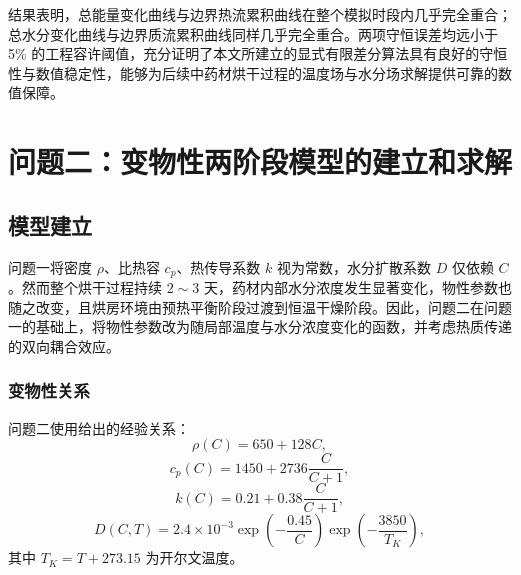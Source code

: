 \documentclass[withoutpreface,bwprint]{cumcm_thesis}
\begin{document}
结果表明，总能量变化曲线与边界热流累积曲线在整个模拟时段内几乎完全重合；总水分变化曲线与边界质流累积曲线同样几乎完全重合。两项守恒误差均远小于 5\% 的工程容许阈值，充分证明了本文所建立的显式有限差分算法具有良好的守恒性与数值稳定性，能够为后续中药材烘干过程的温度场与水分场求解提供可靠的数值保障。





















\newpage
\section{问题二：变物性两阶段模型的建立和求解}
\subsection{模型建立}

问题一将密度 \(\rho\)、比热容 \(c_p\)、热传导系数 \(k\) 视为常数，水分扩散系数 \(D\) 仅依赖 \(C\)。然而整个烘干过程持续 \(2\sim3\) 天，药材内部水分浓度发生显著变化，物性参数也随之改变，且烘房环境由预热平衡阶段过渡到恒温干燥阶段。因此，问题二在问题一的基础上，将物性参数改为随局部温度与水分浓度变化的函数，并考虑热质传递的双向耦合效应。

\subsubsection{变物性关系}

问题二使用给出的经验关系：
\begin{equation}
\rho(C) = 650 + 128C,
\end{equation}
\begin{equation}
c_p(C) = 1450 + 2736\frac{C}{C+1},
\end{equation}
\begin{equation}
k(C) = 0.21 + 0.38\frac{C}{C+1},
\end{equation}
\begin{equation}
D(C,T) = 2.4\times 10^{-3}\exp\left(-\frac{0.45}{C}\right)\exp\left(-\frac{3850}{T_K}\right),
\end{equation}
其中 \(T_K = T + 273.15\) 为开尔文温度。
\end{document}
